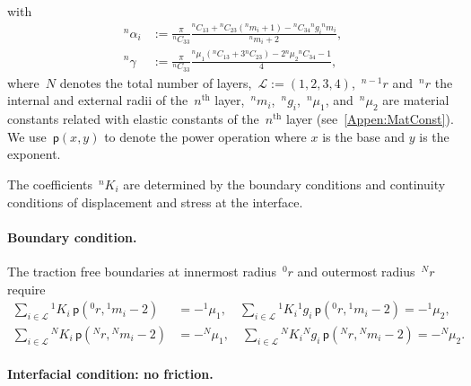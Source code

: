 \documentclass[preprint,10pt,times]{elsarticle}
\numberwithin{equation}{section}
\newcommand{\pr}[1]{\left( #1 \right)}
\newcommand{\p}{\,\mathsf{p}}
\renewcommand{\>}{$\Rightarrow$}
\begin{document}
with
\begin{subequations}
	\begin{align}
	{}^{n}\!{\alpha_{i}} & := \frac{\pi}{{}^{n}\!{C_{33}}} \frac{  {}^{n}\!{C_{13}} + {}^{n}\!{C_{23}}({}^{n}\!{m_{i}} + 1) - {}^{n}\!{C_{34}} {}^{n}\!{g_{i}} {}^{n}\!{m_{i}} }{{}^{n}\!{m_{i}}+2}, \\
	{}^{n}\!\gamma & := \frac{\pi}{{}^{n}\!{C_{33}}} \frac{ {}^{n}\!{\mu_{1}} ({}^{n}\!{C_{13}} + 3{}^{n}\!{C_{23}}) - 2{}^{n}\!{\mu_{2}} {}^{n}\!{C_{34}} - 1  }{4},
	\end{align}
\end{subequations}
where~$N$ denotes the total number of layers,~$\mathcal{L} := \pr{1,2,3,4}$,~${}^{n-1}\!{r}$ and~${}^{n}\!{r}$ the internal and external radii of the~$n^\text{th}$ layer,~${}^{n}\!{m_{i}}$,~${}^{n}\!{g_{i}}$,~${}^{n}\!{\mu_{1}}$, and~${}^{n}\!{\mu_{2}}$ are material constants related with elastic constants of the~$n^\text{th}$ layer (see~\ref{Appen:MatConst}). We use $\p\pr{x,y}$ to denote the power operation where $x$ is the base and $y$ is the exponent.

The coefficients~${}^{n}\!{K_{i}}$ are determined by the boundary conditions and continuity conditions of displacement and stress at the interface.

\paragraph{Boundary condition.}

The traction free boundaries at innermost radius~${}^{0}\!{r}$ and outermost radius~${}^{N}\!{r}$ require
\begin{subequations}
	\begin{align}
	\sum_{i \in \mathcal{L}} {}^{1}\!{K_{i}} \p\pr{{}^{0}\!{r},{}^{1}\!{m_{i}} - 2} & = -{}^{1}\!{\mu_{1}}, \quad
	\sum_{i \in \mathcal{L}} {}^{1}\!{K_{i}} {}^{1}\!{g_{i}} \p\pr{{}^{0}\!{r},{}^{1}\!{m_{i}} - 2} = -{}^{1}\!{\mu_{2}},\\
	\sum_{i \in \mathcal{L}} {}^{N}\!{K_{i}} \p\pr{{}^{N}\!{r},{}^{N}\!{m_{i}} - 2} & = -{}^{N}\!{\mu_{1}}, \quad
	\sum_{i \in \mathcal{L}} {}^{N}\!{K_{i}} {}^{N}\!{g_{i}} \p\pr{{}^{N}\!{r},{}^{N}\!{m_{i}} - 2} = -{}^{N}\!{\mu_{2}}.
	\end{align}
	\label{eq:boundary}
\end{subequations}

\paragraph{Interfacial condition: no friction.}
\end{document}
